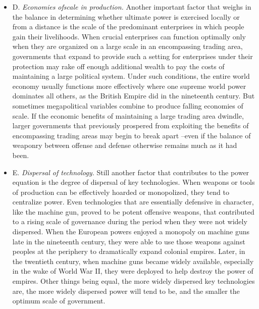 \begin{paracol}{2}
\begin{itemize}
  \item D. \emph{Economies ofscale in production.} Another important factor that weighs in the balance in determining whether ultimate power is exercised locally or from a distance is the scale of the predominant enterprises in which people gain their livelihoods. When crucial enterprises can function optimally only when they are organized on a large scale in an encompassing trading area, governments that expand to provide such a setting for enterprises under their protection may rake off enough additional wealth to pay the costs of maintaining a large political system. Under such conditions, the entire world economy usually functions more effectively where one supreme world power dominates all others, as the British Empire did in the nineteenth century. But sometimes megapolitical variables combine to produce falling economies of scale. If the economic benefits of maintaining a large trading area dwindle, larger governments that previously prospered from exploiting the benefits of encompassing trading areas may begin to break apart --even if the balance of weaponry between offense and defense otherwise remains much as it had been.
  \item E. \emph{Dispersal of technology.} Still another factor that contributes to the power equation is the degree of dispersal of key technologies. When weapons or tools of production can be effectively hoarded or monopolized, they tend to centralize power. Even technologies that are essentially defensive in character, like the machine gun, proved to be potent offensive weapons, that contributed to a rising scale of governance during the period when they were not widely dispersed. When the European powers enjoyed a monopoly on machine guns late in the nineteenth century, they were able to use those weapons against peoples at the periphery to dramatically expand colonial empires. Later, in the twentieth century, when machine guns became widely available, especially in the wake of World War II, they were deployed to help destroy the power of empires. Other things being equal, the more widely dispersed key technologies are, the more widely dispersed power will tend to be, and the smaller the optimum scale of government.
\end{itemize}  


\end{paracol}
